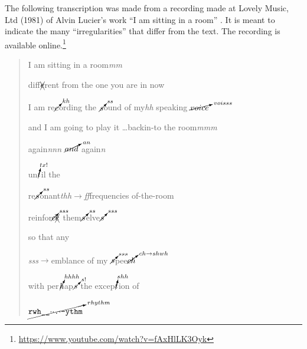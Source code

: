 The following transcription was made from a recording made at Lovely Music, Ltd (1981) of Alvin Lucier's work ``I am sitting in a room'' \parencite{Luc70:Iam}. It is meant to indicate the many ``irregularities'' that differ from the text. The recording is available online.\footnote{\url{https://www.youtube.com/watch?v=fAxHlLK3Oyk}} 
\begin{quote}
\small
I am sitting in a room\textit{mm}\par
diff$\xcancel{e}$rent from the one you are in now\par
{}
I am re$\cancelto{kh}{c}$ording the $\cancelto{ss}{s}$ound of my\textit{hh} speaking $\cancelto{voisss}{voice}$ \par
{}
and I am going to play it \dots backin-to the room\textit{mmm} \par
again\textit{nnn} $\cancelto{an}{and}$  again\textit{n} \par
{}
un$\cancelto{tx!}{t}$il the\par
re$\cancelto{ss}{s}$onant\textit{thh$\rightarrow$ff}frequencies of-the-room\par
{}
reinfor$\cancelto{sss}{c}\xcancel{e}$ them$\cancelto{ss}{s}$elve$\cancelto{sss}{s}$\par
{}
so that any \par
\textit{{\small s}ss}$\rightarrow$emblance of my $\cancelto{sss}{s}$pee$\cancelto{ch\rightarrow shwh}{ch}$\par
{}
with per$\cancelto{hhhh}{h}$ap$\cancelto{s!}{s}$ the excep$\cancelto{shh}{t}$ion of\par
$\cancelto{rhythm}{\texttt{rwh\_\_$\cdot\cdot$.$\cdot$-ythm}}$



\end{quote}
